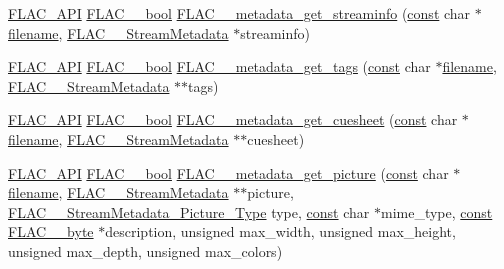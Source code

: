 \begin{DoxyCompactItemize}
\item 
\hyperlink{group__flac__export_ga56ca07df8a23310707732b1c0007d6f5}{F\+L\+A\+C\+\_\+\+A\+PI} \hyperlink{ordinals_8h_a95103469f1cbd78b8cf250194985b34e}{F\+L\+A\+C\+\_\+\+\_\+bool} \hyperlink{group__flac__metadata__level0_gaf248d1ccc8025b9e9d7f532b8af4ab07}{F\+L\+A\+C\+\_\+\+\_\+metadata\+\_\+get\+\_\+streaminfo} (\hyperlink{getopt1_8c_a2c212835823e3c54a8ab6d95c652660e}{const} char $\ast$\hyperlink{test__portburn_8cpp_a7efa5e9c7494c7d4586359300221aa5d}{filename}, \hyperlink{struct_f_l_a_c_____stream_metadata}{F\+L\+A\+C\+\_\+\+\_\+\+Stream\+Metadata} $\ast$streaminfo)
\item 
\hyperlink{group__flac__export_ga56ca07df8a23310707732b1c0007d6f5}{F\+L\+A\+C\+\_\+\+A\+PI} \hyperlink{ordinals_8h_a95103469f1cbd78b8cf250194985b34e}{F\+L\+A\+C\+\_\+\+\_\+bool} \hyperlink{group__flac__metadata__level0_gaf66469f31dca28837ffd3f8b0ec5c082}{F\+L\+A\+C\+\_\+\+\_\+metadata\+\_\+get\+\_\+tags} (\hyperlink{getopt1_8c_a2c212835823e3c54a8ab6d95c652660e}{const} char $\ast$\hyperlink{test__portburn_8cpp_a7efa5e9c7494c7d4586359300221aa5d}{filename}, \hyperlink{struct_f_l_a_c_____stream_metadata}{F\+L\+A\+C\+\_\+\+\_\+\+Stream\+Metadata} $\ast$$\ast$tags)
\item 
\hyperlink{group__flac__export_ga56ca07df8a23310707732b1c0007d6f5}{F\+L\+A\+C\+\_\+\+A\+PI} \hyperlink{ordinals_8h_a95103469f1cbd78b8cf250194985b34e}{F\+L\+A\+C\+\_\+\+\_\+bool} \hyperlink{group__flac__metadata__level0_ga6ee2633dc179c2a0cb5fef5762faf0fd}{F\+L\+A\+C\+\_\+\+\_\+metadata\+\_\+get\+\_\+cuesheet} (\hyperlink{getopt1_8c_a2c212835823e3c54a8ab6d95c652660e}{const} char $\ast$\hyperlink{test__portburn_8cpp_a7efa5e9c7494c7d4586359300221aa5d}{filename}, \hyperlink{struct_f_l_a_c_____stream_metadata}{F\+L\+A\+C\+\_\+\+\_\+\+Stream\+Metadata} $\ast$$\ast$cuesheet)
\item 
\hyperlink{group__flac__export_ga56ca07df8a23310707732b1c0007d6f5}{F\+L\+A\+C\+\_\+\+A\+PI} \hyperlink{ordinals_8h_a95103469f1cbd78b8cf250194985b34e}{F\+L\+A\+C\+\_\+\+\_\+bool} \hyperlink{group__flac__metadata__level0_gaa13138ab038694909964998a113817b4}{F\+L\+A\+C\+\_\+\+\_\+metadata\+\_\+get\+\_\+picture} (\hyperlink{getopt1_8c_a2c212835823e3c54a8ab6d95c652660e}{const} char $\ast$\hyperlink{test__portburn_8cpp_a7efa5e9c7494c7d4586359300221aa5d}{filename}, \hyperlink{struct_f_l_a_c_____stream_metadata}{F\+L\+A\+C\+\_\+\+\_\+\+Stream\+Metadata} $\ast$$\ast$picture, \hyperlink{group__flac__format_gaf6d3e836cee023e0b8d897f1fdc9825d}{F\+L\+A\+C\+\_\+\+\_\+\+Stream\+Metadata\+\_\+\+Picture\+\_\+\+Type} type, \hyperlink{getopt1_8c_a2c212835823e3c54a8ab6d95c652660e}{const} char $\ast$mime\+\_\+type, \hyperlink{getopt1_8c_a2c212835823e3c54a8ab6d95c652660e}{const} \hyperlink{ordinals_8h_a5eb569b12d5b047cdacada4d57924ee3}{F\+L\+A\+C\+\_\+\+\_\+byte} $\ast$description, unsigned max\+\_\+width, unsigned max\+\_\+height, unsigned max\+\_\+depth, unsigned max\+\_\+colors)
\end{DoxyCompactItemize}


